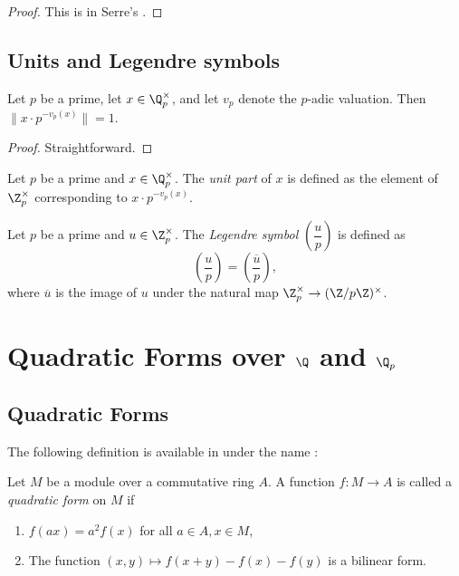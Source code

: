 \begin{proof}
This is in Serre's \cite[\S II.2 Theorem 1]{Ser73}.
\end{proof}

\section[Units and Legendre symbols]{Units and Legendre symbols}\label{sec:padic_legendre}

\begin{lemma}\label{lem:padic_unit_part_unit}
\leanok
Let $p$ be a prime, let $x \in \Q_p^\times$, and let $v_p$ denote the $p$-adic valuation. Then $\|x \cdot p^{-v_p(x)}\| = 1$.
\end{lemma}
\begin{proof}
\leanok
Straightforward.
\end{proof}

\begin{definition}\label{def:padicUnitPart}
  \leanok
Let $p$ be a prime and $x \in \Q_p^\times$. The \emph{unit part} of $x$ is defined as the element
of $\Z_p^\times$ corresponding to $x \cdot p^{-v_p(x)}$.
\end{definition}

\begin{definition}\label{def:legendreSym}
  \leanok
Let $p$ be a prime and $u \in \Z_p^\times$. The \emph{Legendre symbol} $\left(\dfrac{u}{p}\right)$
is defined as
\[\left(\dfrac{u}{p}\right)=\left(\dfrac{\overline{u}}{p}\right),\]
where $\overline{u}$ is the image of $u$ under the natural map $\Z_p^\times \to (\Z/p\Z)^\times$.
\end{definition}


\chapter[Quadratic Forms over the Rationals and the p-adics]{Quadratic Forms over $\Q$ and $\Q_p$}

\section{Quadratic Forms}\label{sec:quadratic_form}

The following definition is available in \mathlib under the name :
\begin{definition}\label{def:quadratic_form}
\mathlibok
Let $M$ be a module over a commutative ring $A$. A function $f : M \to A$ is called a \emph{quadratic form} on $M$ if
\begin{enumerate}
\item $f(ax) = a^2f(x)$ for all $a \in A, x \in M$,
\item The function $(x, y) \mapsto f(x + y) - f(x) - f(y)$ is a bilinear form.
\end{enumerate}
\end{definition}

